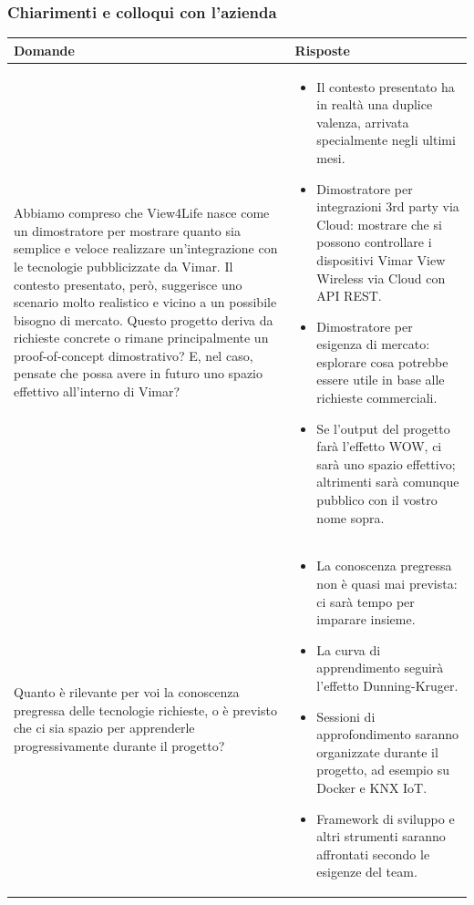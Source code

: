\documentclass[a4paper,11pt]{article}
\begin{document}
\subsubsection{Chiarimenti e colloqui con l'azienda}
{\footnotesize
\begin{tabularx}{\textwidth}{|>{\raggedright\arraybackslash}X|>{\raggedright\arraybackslash}X|}
\hline
\textbf{Domande} & \textbf{Risposte} \\
\hline
Abbiamo compreso che View4Life nasce come un dimostratore per mostrare quanto sia semplice e veloce realizzare un’integrazione con le tecnologie pubblicizzate da Vimar. Il contesto presentato, però, suggerisce uno scenario molto realistico e vicino a un possibile bisogno di mercato. Questo progetto deriva da richieste concrete o rimane principalmente un proof-of-concept dimostrativo? E, nel caso, pensate che possa avere in futuro uno spazio effettivo all’interno di Vimar? 
&
\begin{itemize}
\item Il contesto presentato ha in realtà una duplice valenza, arrivata specialmente negli ultimi mesi.
\item Dimostratore per integrazioni 3rd party via Cloud: mostrare che si possono controllare i dispositivi Vimar View Wireless via Cloud con API REST.
\item Dimostratore per esigenza di mercato: esplorare cosa potrebbe essere utile in base alle richieste commerciali.
\item Se l’output del progetto farà l’effetto WOW, ci sarà uno spazio effettivo; altrimenti sarà comunque pubblico con il vostro nome sopra.
\end{itemize} \\
\hline
Quanto è rilevante per voi la conoscenza pregressa delle tecnologie richieste, o è previsto che ci sia spazio per apprenderle progressivamente durante il progetto?
&
\begin{itemize}
\item La conoscenza pregressa non è quasi mai prevista: ci sarà tempo per imparare insieme.
\item La curva di apprendimento seguirà l’effetto Dunning-Kruger.
\item Sessioni di approfondimento saranno organizzate durante il progetto, ad esempio su Docker e KNX IoT.
\item Framework di sviluppo e altri strumenti saranno affrontati secondo le esigenze del team.
\end{itemize} \\

\end{tabularx}}
\end{document}
